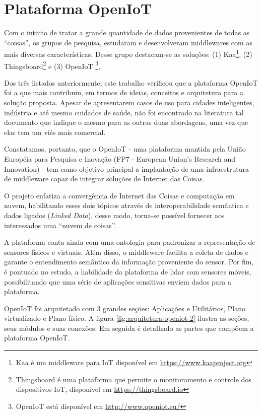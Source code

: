 
\section{Plataforma OpenIoT}\label{sec:openiot}

Com o intuito de tratar a grande quantidade de dados provenientes de todas as
``coisas'', os grupos de pesquisa, estudaram e desenvolveram middlewares com as
mais diversas características. Desse grupo destacam-se as soluções: (1) Kaa\footnote{Kaa é um
middleware para IoT disponível em \url{https://www.kaaproject.org}},
(2) Thingsboard\footnote{Thingsboard é uma plataforma que permite o monitoramento 
e controle dos dispositivos IoT, disponível em \url{https://thingsboard.io}} e (3) OpenIoT
\footnote{OpenIoT está disponível em \url{http://www.openiot.eu/}}.

Dos três listados anteriormente, este trabalho verificou que a plataforma
OpenIoT foi a que mais contribuiu, em termos de ideias, conceitos e arquitetura
para a solução proposta. Apesar de apresentarem casos de uso para cidades
inteligentes, indústria e até mesmo cuidados de saúde, não foi encontrado na
literatura tal documento que indique o mesmo para as outras duas abordagens,
uma vez que elas tem um viés mais comercial.

Constatamos, portanto, que o OpenIoT - uma plataforma mantida pela União
Européia para Pesquisa e Inovação (FP7 - European Union's Research and
Innovation) - tem como objetivo principal a implantação de uma infraestrutura
de middleware capaz de integrar soluções de Internet das Coisas.

O projeto enfatiza a convergência de Internet das Coisas e computação em nuvem,
habilitando esses dois tópicos através de interoperabilidade semântica e dados
ligados (\textit{Linked Data}), desse modo, torna-se possível fornecer aos interessados
uma ``nuvem de coisas''.

A plataforma conta ainda com uma ontologia para padronizar a representação de
sensores físicos e virtuais. Além disso, o middleware facilita a coleta de
dados e garante o entendimento semântico da informação proveniente do sensor.
Por fim, é pontuado no estudo, a habilidade da plataforma de lidar com sensores
móveis, possibilitando que uma série de aplicações sensitivas enviem dados para
a plataforma.

OpenIoT foi arquitetado com 3 grandes seções: Aplicações e Utilitários, Plano
virtualizado e Plano físico. A figura \ref{fig:arquitetura-openiot-2} ilustra as
seções, seus módulos e suas conexões. Em seguida é detalhado as partes que
compõem a plataforma OpenIoT.

